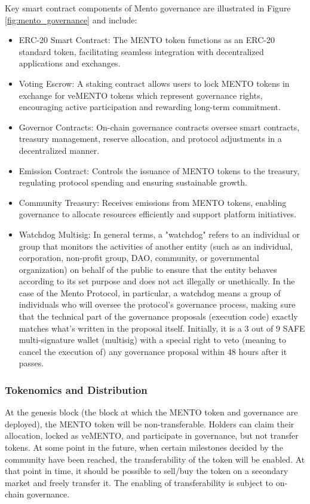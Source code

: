 \documentclass[a4paper]{article}
\theoremstyle{definition}
\begin{document}
Key smart contract components of Mento governance are illustrated in Figure \ref{fig:mento_governance} and include:
\begin{itemize}
    \item ERC-20 Smart Contract: The MENTO token functions as an ERC-20 standard token, facilitating seamless integration with decentralized applications and exchanges.
    \item Voting Escrow: A staking contract allows users to lock MENTO tokens in exchange for veMENTO tokens which represent governance rights, encouraging active participation and rewarding long-term commitment.
    \item Governor Contracts: On-chain governance contracts oversee smart contracts, treasury management, reserve allocation, and protocol adjustments in a decentralized manner.
    \item Emission Contract: Controls the issuance of MENTO tokens to the treasury, regulating protocol spending and ensuring sustainable growth.
    \item Community Treasury: Receives emissions from MENTO tokens, enabling governance to allocate resources efficiently and support platform initiatives.
    \item Watchdog Multisig: In general terms, a "watchdog" refers to an individual or group that monitors the activities of another entity (such as an individual, corporation, non-profit group, DAO, community, or governmental organization) on behalf of the public to ensure that the entity behaves according to its set purpose and does not act illegally or unethically. In the case of the Mento Protocol, in particular, a watchdog means a group of individuals who will oversee the protocol's governance process, making sure that the technical part of the governance proposals (execution code) exactly matches what's written in the proposal itself. Initially, it is a 3 out of 9 SAFE multi-signature wallet (multisig) with a special right to veto (meaning to cancel the execution of) any governance proposal within 48 hours after it passes.
\end{itemize}

\subsubsection{Tokenomics and Distribution}\label{sec:token_distribution}
At the genesis block (the block at which the MENTO token and governance are deployed), the MENTO token will be non-transferable. Holders can claim their allocation, locked as veMENTO, and participate in governance, but not transfer tokens. At some point in the future, when certain milestones decided by the community have been reached, the transferability of the token will be enabled. At that point in time, it should be possible to sell/buy the token on a secondary market and freely transfer it. The enabling of transferability is subject to on-chain governance.
\end{document}
